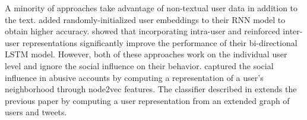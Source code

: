 A minority of approaches take advantage of non-textual user data in addition to the text.
\citet{2017improved} added randomly-initialized user embeddings to their RNN model to obtain higher accuracy.
\citet{qian2018} showed that incorporating intra-user and reinforced inter-user representations significantly improve the performance of their bi-directional LSTM model. However, both of these approaches work on the individual user level and ignore the social influence on their behavior. \citet{mishra2018} captured the social influence in abusive accounts by computing a representation of a user's neighborhood through node2vec features.  The classifier described in \citet{mishra2019abusive} extends the previous paper by computing a user representation from an extended graph of users and tweets.
